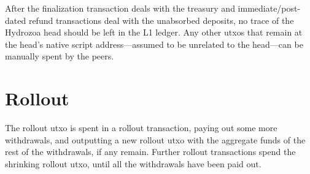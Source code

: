 \documentclass[../hydrozoa.tex]{subfiles}
\begin{document}
After the finalization transaction deals with the treasury and immediate/post-dated refund transactions deal with the unabsorbed deposits, no trace of the Hydrozoa head should be left in the L1 ledger.
Any other utxos that remain at the head's native script address---assumed to be unrelated to the head---can be manually spent by the peers.

\section{Rollout}%
\label{h:l1-multisig-rollout}%

The rollout utxo is spent in a rollout transaction, paying out some more withdrawals, and outputting a new rollout utxo with the aggregate funds of the rest of the withdrawals, if any remain.
Further rollout transactions spend the shrinking rollout utxo, until all the withdrawals have been paid out.

\end{document}
